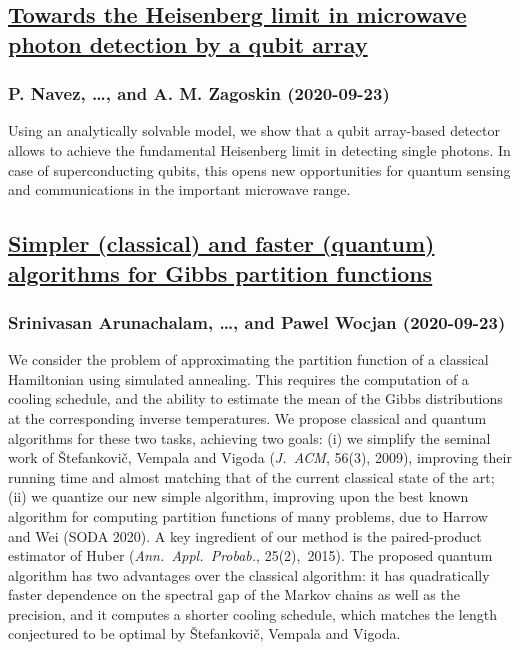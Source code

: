 \subsection*{\href{http://arxiv.org/abs/2009.11271v2}{Towards the Heisenberg limit in microwave photon detection by a qubit  array}}
\subsubsection*{P. Navez, \dots, and A. M. Zagoskin (2020-09-23)}
Using an analytically solvable model, we show that a qubit array-based
detector allows to achieve the fundamental Heisenberg limit in detecting single
photons. In case of superconducting qubits, this opens new opportunities for
quantum sensing and communications in the important microwave range.

\subsection*{\href{http://arxiv.org/abs/2009.11270v1}{Simpler (classical) and faster (quantum) algorithms for Gibbs partition  functions}}
\subsubsection*{Srinivasan Arunachalam, \dots, and Pawel Wocjan (2020-09-23)}
We consider the problem of approximating the partition function of a
classical Hamiltonian using simulated annealing. This requires the computation
of a cooling schedule, and the ability to estimate the mean of the Gibbs
distributions at the corresponding inverse temperatures. We propose classical
and quantum algorithms for these two tasks, achieving two goals: (i) we
simplify the seminal work of \v{S}tefankovi\v{c}, Vempala and Vigoda
(\emph{J.~ACM}, 56(3), 2009), improving their running time and almost matching
that of the current classical state of the art; (ii) we quantize our new simple
algorithm, improving upon the best known algorithm for computing partition
functions of many problems, due to Harrow and Wei (SODA 2020). A key ingredient
of our method is the paired-product estimator of Huber (\emph{Ann.\ Appl.\
Probab.}, 25(2),~2015). The proposed quantum algorithm has two advantages over
the classical algorithm: it has quadratically faster dependence on the spectral
gap of the Markov chains as well as the precision, and it computes a shorter
cooling schedule, which matches the length conjectured to be optimal by
\v{S}tefankovi\v{c}, Vempala and Vigoda.

